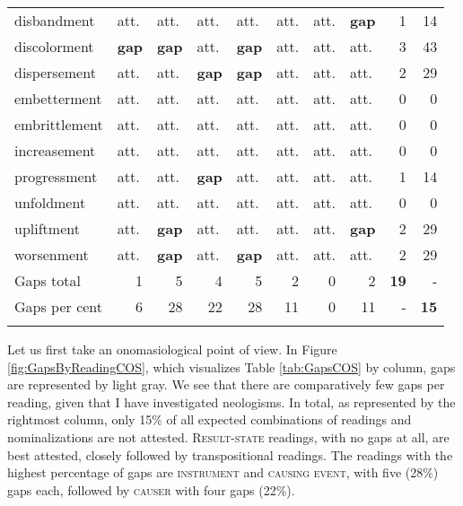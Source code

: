 \begin{table}
\begin{tabular}{llllllllrr}
 disbandment& att.& att.& att. & att.& att.& att. & \textbf{gap}& 1 & 14 \\
discolorment & \textbf{gap} & \textbf{gap} & att. & \textbf{gap} & att.& att. & att. & 3 & 43 \\
 dispersement & att.& att.& \textbf{gap}& \textbf{gap} & att.& att. & att. & 2 & 29 \\
embetterment & att.& att.& att. & att.& att.& att.& att. & 0 & 0 \\
 embrittlement& att.& att.& att. & att.& att.& att. & att. & 0 & 0 \\
increasement & att.& att.& att. & att.& att.& att.& att. & 0 & 0 \\
 progressment & att.& att.& \textbf{gap}& att.& att.& att.& att. & 1 & 14 \\
unfoldment & att.& att.& att. & att.& att.& att. & att. & 0 & 0 \\
 upliftment & att.& \textbf{gap} & att. & att.& att.& att. & \textbf{gap}& 2 & 29 \\
worsenment & att.& \textbf{gap} & att. & \textbf{gap} & att.& att.& att. & 2 & 29 \\
\midrule
Gaps total & \multicolumn{1}{r}{1}     & \multicolumn{1}{r}{5}     & \multicolumn{1}{r}{4}      & \multicolumn{1}{r}{5}           & \multicolumn{1}{r}{2}     & \multicolumn{1}{r}{0}      & 
\multicolumn{1}{r}{2}  &
\multicolumn{1}{r}{\textbf{19}}&  -\\
Gaps per cent & \multicolumn{1}{r}{6}     & \multicolumn{1}{r}{28}     & \multicolumn{1}{r}{22}      & \multicolumn{1}{r}{28}           & \multicolumn{1}{r}{11}     & \multicolumn{1}{r}{0}      & \multicolumn{1}{r}{11}  & -
 & \multicolumn{1}{r}{\textbf{15}} \\
\lspbottomrule  
\end{tabular}
\end{table}


Let us first take an onomasiological point of view. In Figure \ref{fig:GapsByReadingCOS}, which visualizes Table \ref{tab:GapsCOS} by column, gaps are represented by light gray. We see that there are comparatively few gaps per reading, given that I have investigated neologisms. In total, as represented by the rightmost column, only 15\% of all expected combinations of readings and nominalizations are not attested.
\textsc{Result-state} readings, with no gaps at all, are best attested, closely followed by transpositional readings. The readings with the highest percentage of gaps are \textsc{instrument} and \textsc{causing event}, with five (28\%) gaps each, followed by \textsc{causer} with four gaps (22\%).


